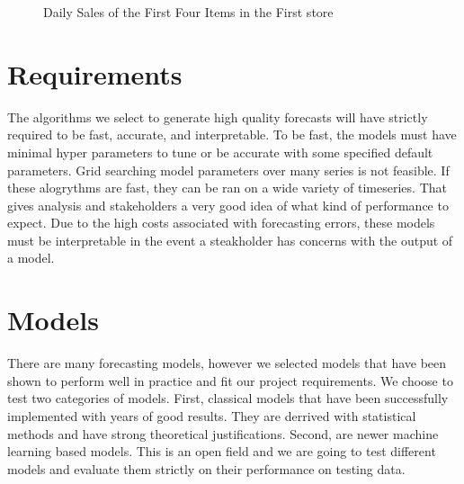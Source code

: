 \documentclass[16pt,twocolumn,letterpaper]{article}
\begin{document}
\begin{figure}[!htb]
	\caption{\label{fig:my-label} Daily Sales of the First Four Items in the First store}
\end{figure}

\section{Requirements}

The algorithms we select to generate high quality forecasts will have strictly required to be fast, accurate, and interpretable. To be fast, the models must have minimal hyper parameters to tune or be accurate with some specified default parameters. Grid searching model parameters over many series is not feasible. If these alogrythms are fast, they can be ran on a wide variety of timeseries. That gives analysis and stakeholders a very good idea of what kind of performance to expect. Due to the high costs associated with forecasting errors, these models must be interpretable in the event a steakholder has concerns with the output of a model. 

\section{Models}

There are many forecasting models, however we selected models that have been shown to perform well in practice and fit our project requirements. We choose to test two categories of models. First, classical models that have been successfully implemented with years of good results. They are derrived with statistical methods and have strong theoretical justifications. Second, are newer machine learning based models. This is an open field and we are going to test different models and evaluate them strictly on their performance on testing data. 
\end{document}
